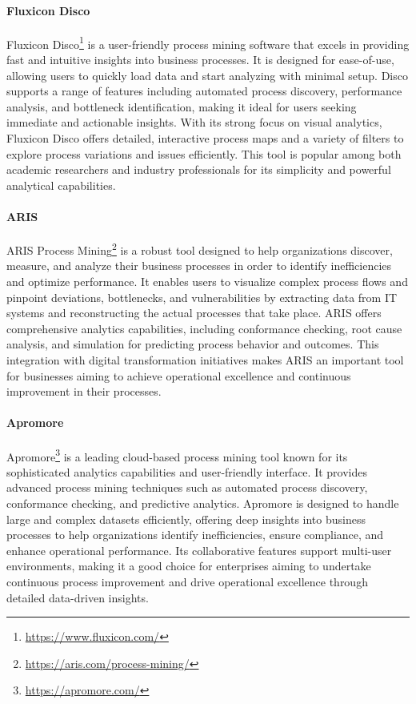\paragraph*{Fluxicon Disco}
Fluxicon Disco\footnote{\url{https://www.fluxicon.com/}} is a user-friendly process mining software that excels in providing fast and intuitive insights into business processes. It is designed for ease-of-use, allowing users to quickly load data and start analyzing with minimal setup. Disco supports a range of features including automated process discovery, performance analysis, and bottleneck identification, making it ideal for users seeking immediate and actionable insights. With its strong focus on visual analytics, Fluxicon Disco offers detailed, interactive process maps and a variety of filters to explore process variations and issues efficiently. This tool is popular among both academic researchers and industry professionals for its simplicity and powerful analytical capabilities.

\paragraph*{ARIS}
ARIS Process Mining\footnote{\url{https://aris.com/process-mining/}} is a robust tool designed to help organizations discover, measure, and analyze their business processes in order to identify inefficiencies and optimize performance. It enables users to visualize complex process flows and pinpoint deviations, bottlenecks, and vulnerabilities by extracting data from IT systems and reconstructing the actual processes that take place. ARIS offers comprehensive analytics capabilities, including conformance checking, root cause analysis, and simulation for predicting process behavior and outcomes. This integration with digital transformation initiatives makes ARIS an important tool for businesses aiming to achieve operational excellence and continuous improvement in their processes.

\paragraph*{Apromore}
Apromore\footnote{\url{https://apromore.com/}} is a leading cloud-based process mining tool known for its sophisticated analytics capabilities and user-friendly interface. It provides advanced process mining techniques such as automated process discovery, conformance checking, and predictive analytics. Apromore is designed to handle large and complex datasets efficiently, offering deep insights into business processes to help organizations identify inefficiencies, ensure compliance, and enhance operational performance. Its collaborative features support multi-user environments, making it a good choice for enterprises aiming to undertake continuous process improvement and drive operational excellence through detailed data-driven insights.

